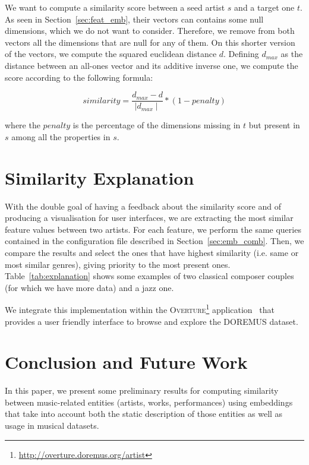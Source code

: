 \documentclass{article}
\begin{document}
\begin{table*}[htbp]
\begin{center}
\begin{tabular}{l|l|l|l|l|l|l|l}
\hline
\end{tabular}
\label{tab:explanation}
\caption{Artist similarity explanation examples.}
\end{center}
\end{table*}

We want to compute a similarity score between a seed artist $s$ and a target one $t$. As seen in Section~\ref{sec:feat_emb}, their vectors can contains some null dimensions, which we do not want to consider. Therefore, we remove from both vectors all the dimensions that are null for any of them. On this shorter version of the vectors, we compute the squared euclidean distance $d$. Defining $d_{max}$ as the distance between an all-ones vector and its additive inverse one, we compute the score according to the following formula:

$$similarity =\frac{d_{max} - d}{\mid d_{max} \mid} * (1-penalty)$$

where the $penalty$ is the percentage of the dimensions missing in $t$ but present in $s$ among all the properties in $s$.


\section{Similarity Explanation}
With the double goal of having a feedback about the similarity score and of producing a visualisation for user interfaces, we are extracting the most similar feature values between two artists. For each feature, we perform the same queries contained in the configuration file described in Section~\ref{sec:emb_comb}. Then, we compare the results and select the ones that have highest similarity (i.e. same or most similar genres), giving priority to the most present ones. Table~\ref{tab:explanation} shows some examples of two classical composer couples (for which we have more data) and a jazz one.

We integrate this implementation within the \textsc{Overture}\footnote{\url{http://overture.doremus.org/artist}} application~\cite{lisena2016exploring} that provides a user friendly interface to browse and explore the DOREMUS dataset.


\section{Conclusion and Future Work}
\label{sec:conclusion}
In this paper, we present some preliminary results for computing similarity between music-related entities (artists, works, performances) using embeddings that take into account both the static description of those entities as well as usage in musical datasets.
\end{document}
